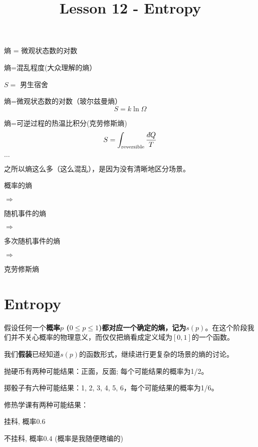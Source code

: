 \documentclass[CJK]{beamer}
\title{Lesson 12 - Entropy}
\author{}
\date{}
\begin{document}


\begin{frame}
\bchL
{}
\emini
{}
熵 = 微观状态数的对数
\emini
\echL
\end{frame}

\begin{frame}
\bchL
\bitem
\item{熵=混乱程度(大众理解的熵）

\begin{center}
$S=$ 男生宿舍
\end{center}
}
\item{熵=微观状态数的对数（玻尔兹曼熵）
$$S = k\ln \Omega$$
}
\item{熵=可逆过程的热温比积分(克劳修斯熵)
$$S = \int_{\rm reversible} \frac{\dbar Q}{T}$$
}
\item{$\ldots$}
\eitem

之所以熵这么多（这么混乱），是因为没有清晰地区分场景。
\echL
\end{frame}


\begin{frame}
\bchL

概率的熵

$\Rightarrow$

随机事件的熵

$\Rightarrow$

多次随机事件的熵

$\Rightarrow$

克劳修斯熵

\echL
\end{frame}

\section{Entropy}

\begin{frame}
\bchL

假设任何一个{\blue \bf 概率$p$ ($0\le p\le 1$)都对应一个确定的熵，记为$s(p)$}。在这个阶段我们并不关心概率的物理意义，而仅仅把熵看成定义域为$[0,1]$的一个函数。

\skipline

我们{\bf 假装}已经知道$s(p)$的函数形式，继续进行更复杂的场景的熵的讨论。
\echL
\end{frame}


\begin{frame}
\bchL
\bitem
\item{抛硬币有两种可能结果：正面，反面; 每个可能结果的概率为1/2。

}
\item{掷骰子有六种可能结果：1, 2, 3, 4, 5, 6，每个可能结果的概率为1/6。

}
\item{修热学课有两种可能结果：

挂科, 概率$0.6$ 

不挂科, 概率$0.4$  {\hskip 0.5in} {\small (概率是我随便瞎编的)}
}
\eitem

\echL
\end{frame}
\end{document}
